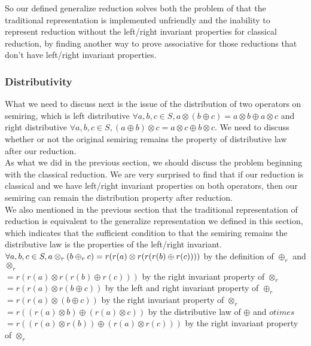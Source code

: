\documentclass[a4paper,10pt]{article}
\begin{document}
So our defined generalize reduction solves both the problem of that the traditional representation is implemented unfriendly and the inability to represent reduction without the left/right invariant properties for classical reduction, by finding another way to prove associative for those reductions that don't have left/right invariant properties.\\
\subsubsection{Distributivity}
What we need to discuss next is the issue of the distribution of two operators on semiring, which is left distributive $\forall a,b,c \in S, a\otimes (b \oplus c) = a \otimes b \oplus a \otimes c$ and right distributive $\forall a,b,c \in S, (a \oplus b) \otimes c = a \otimes c \oplus b \otimes c$.
We need to discuss whether or not the original semiring remains the property of distributive law after our reduction. \\
As what we did in the previous section, we should discuss the problem beginning  with  the classical reduction. We are very surprised to find that if our reduction is classical and we have left/right invariant properties on both operators, then our semiring can remain the distribution property after reduction.\\
We also mentioned in the previous section that the traditional representation of reduction is equivalent to the generalize representation we defined in this section, which indicates that the sufficient condition to that the semiring remains the distributive law is the properties of the left/right invariant.\\
$\forall a,b,c \in S,  a \otimes_r (b \oplus_r c)  \\
= r(r(a) \otimes r(r(r(b)\oplus r(c)))) $ by the definition of $\oplus_r$ and $\otimes_r$\\
$= r(r(a) \otimes r(r(b)\oplus r(c))) $ by the right invariant property of $\otimes_r$\\
$= r(r(a) \otimes r(b \oplus c)) $ by the left and right invariant property of $\oplus_r$\\
$= r(r(a) \otimes (b \oplus c)) $ by the right invariant property of $\otimes_r$\\
$= r((r(a) \otimes b) \oplus (r(a) \otimes c)) $ by the distributive law of $\oplus$ and $otimes$\\
$= r((r(a) \otimes r(b)) \oplus (r(a) \otimes r(c))) $ by the right invariant property of $\otimes_r$\\
\end{document}
